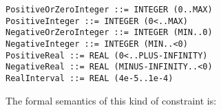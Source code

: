 \vspace*{-1mm}

\noindent
\texttt{\small PositiveOrZeroInteger ::= INTEGER (0..MAX)}\\
\noindent
\texttt{\small PositiveInteger ::= INTEGER (0<..MAX)}\\
\noindent
\texttt{\small NegativeOrZeroInteger ::= INTEGER (MIN..0)}\\
\noindent
\texttt{\small NegativeInteger ::= INTEGER (MIN..<0)}\\
\noindent
\texttt{\small PositiveReal ::= REAL (0<..PLUS-INFINITY)}\\
\noindent
\texttt{\small NegativeReal ::= REAL (MINUS-INFINITY..<0)}\\
\noindent
\texttt{\small RealInterval ::= REAL (4e-5..1e-4)}

\noindent
The formal semantics of this kind of constraint is:

\medskip

